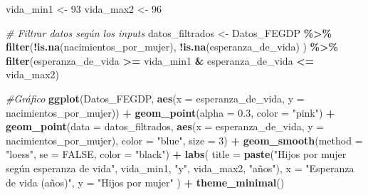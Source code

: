 \documentclass[
]{article}
\newenvironment{Shaded}{\begin{snugshade}}{\end{snugshade}}
\newcommand{\AttributeTok}[1]{\textcolor[rgb]{0.13,0.29,0.53}{#1}}
\newcommand{\CommentTok}[1]{\textcolor[rgb]{0.56,0.35,0.01}{\textit{#1}}}
\newcommand{\ConstantTok}[1]{\textcolor[rgb]{0.56,0.35,0.01}{#1}}
\newcommand{\DecValTok}[1]{\textcolor[rgb]{0.00,0.00,0.81}{#1}}
\newcommand{\FloatTok}[1]{\textcolor[rgb]{0.00,0.00,0.81}{#1}}
\newcommand{\FunctionTok}[1]{\textcolor[rgb]{0.13,0.29,0.53}{\textbf{#1}}}
\newcommand{\NormalTok}[1]{#1}
\newcommand{\OtherTok}[1]{\textcolor[rgb]{0.56,0.35,0.01}{#1}}
\newcommand{\SpecialCharTok}[1]{\textcolor[rgb]{0.81,0.36,0.00}{\textbf{#1}}}
\newcommand{\StringTok}[1]{\textcolor[rgb]{0.31,0.60,0.02}{#1}}
\begin{document}
\begin{Shaded}
\begin{Highlighting}[]
\NormalTok{vida\_min1 }\OtherTok{\textless{}{-}} \DecValTok{93}
\NormalTok{vida\_max2 }\OtherTok{\textless{}{-}} \DecValTok{96}
  
  \CommentTok{\# Filtrar datos según los inputs}
\NormalTok{  datos\_filtrados }\OtherTok{\textless{}{-}}\NormalTok{ Datos\_FEGDP }\SpecialCharTok{\%\textgreater{}\%}
    \FunctionTok{filter}\NormalTok{(}\SpecialCharTok{!}\FunctionTok{is.na}\NormalTok{(nacimientos\_por\_mujer),}
      \SpecialCharTok{!}\FunctionTok{is.na}\NormalTok{(esperanza\_de\_vida)}
\NormalTok{    ) }\SpecialCharTok{\%\textgreater{}\%}
    \FunctionTok{filter}\NormalTok{(esperanza\_de\_vida }\SpecialCharTok{\textgreater{}=}\NormalTok{ vida\_min1 }\SpecialCharTok{\&}\NormalTok{ esperanza\_de\_vida }\SpecialCharTok{\textless{}=}\NormalTok{ vida\_max2)}

\CommentTok{\#Gráfico}
 \FunctionTok{ggplot}\NormalTok{(Datos\_FEGDP, }\FunctionTok{aes}\NormalTok{(}\AttributeTok{x =}\NormalTok{ esperanza\_de\_vida, }\AttributeTok{y =}\NormalTok{ nacimientos\_por\_mujer)) }\SpecialCharTok{+}
    \FunctionTok{geom\_point}\NormalTok{(}\AttributeTok{alpha =} \FloatTok{0.3}\NormalTok{, }\AttributeTok{color =} \StringTok{"pink"}\NormalTok{) }\SpecialCharTok{+}
    \FunctionTok{geom\_point}\NormalTok{(}\AttributeTok{data =}\NormalTok{ datos\_filtrados, }\FunctionTok{aes}\NormalTok{(}\AttributeTok{x =}\NormalTok{ esperanza\_de\_vida, }\AttributeTok{y =}\NormalTok{ nacimientos\_por\_mujer), }
               \AttributeTok{color =} \StringTok{"blue"}\NormalTok{, }\AttributeTok{size =} \DecValTok{3}\NormalTok{) }\SpecialCharTok{+}
    \FunctionTok{geom\_smooth}\NormalTok{(}\AttributeTok{method =} \StringTok{"loess"}\NormalTok{, }\AttributeTok{se =} \ConstantTok{FALSE}\NormalTok{, }\AttributeTok{color =} \StringTok{"black"}\NormalTok{) }\SpecialCharTok{+}
    \FunctionTok{labs}\NormalTok{(}
      \AttributeTok{title =} \FunctionTok{paste}\NormalTok{(}\StringTok{"Hijos por mujer según esperanza de vida"}\NormalTok{,}
\NormalTok{                    vida\_min1, }\StringTok{"y"}\NormalTok{, vida\_max2, }\StringTok{"años"}\NormalTok{),}
      \AttributeTok{x =} \StringTok{"Esperanza de vida (años)"}\NormalTok{,}
      \AttributeTok{y =} \StringTok{"Hijos por mujer"}
\NormalTok{    ) }\SpecialCharTok{+}
    \FunctionTok{theme\_minimal}\NormalTok{()}
\end{Highlighting}
\end{Shaded}
\end{document}
